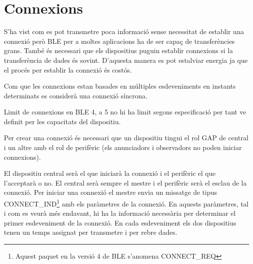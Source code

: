 \begin{figure}[hb]
	\begin{center}
		\begin{subfigmatrix}{1}
		\end{subfigmatrix}
	\end{center}
\end{figure}

\section{Connexions}
S'ha vist com es pot transmetre poca informació sense necessitat de establir una connexió però BLE per a moltes aplicacions ha de ser capaç de transferències grans.
També és necessari que els dispositius puguin establir connexions si la transferència de dades és sovint.
D'aquesta manera es pot estalviar energia ja que el procés per establir la connexió és costós.

Com que les connexions estan basades en múltiples esdeveniments en instants determinats es considerà una connexió síncrona.

Limit de connexions en BLE 4, a 5 no hi ha limit segons especificació per tant ve definit per les capacitats del dispositiu.

Per crear una connexió és necessari que un dispositiu tingui el rol GAP de central i un altre amb el rol de perifèric (els anunciadors i observadors no poden iniciar connexions).

El dispositiu central serà el que iniciarà la connexió i el perifèric el que l'acceptarà o no.
El central serà sempre el mestre i el perifèric serà el esclau de la connexió.
Per iniciar una connexió el mestre envia un missatge de tipus CONNECT\_IND\footnote{Aquest paquet en la versió 4 de BLE s'anomena CONNECT\_REQ} amb els paràmetres de la connexió.
En aquests paràmetres, tal i com es veurà més endavant, hi ha la informació necessària per determinar el primer esdeveniment de la connexió.
En cada esdeveniment els dos dispositius tenen un temps assignat per transmetre i per rebre dades.

